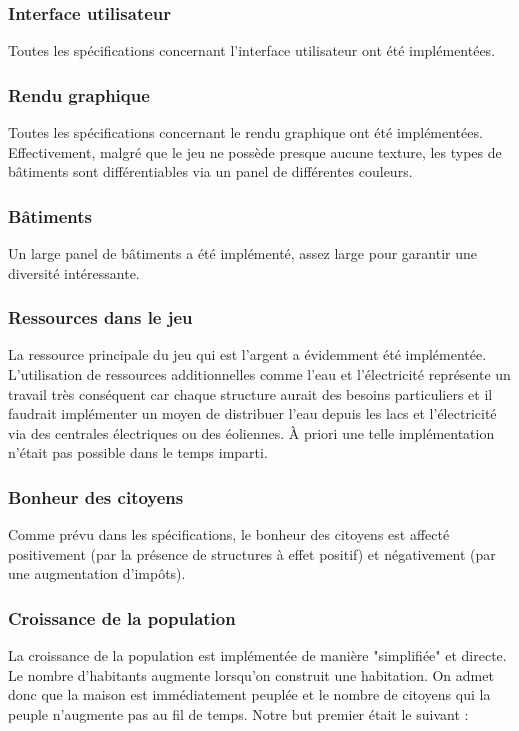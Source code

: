 \documentclass[a4paper,10pt,openany,oneside]{report}
\begin{document}
\subsubsection{Interface utilisateur}
Toutes les spécifications concernant l'interface utilisateur ont été implémentées.

\subsubsection{Rendu graphique}
Toutes les spécifications concernant le rendu graphique ont été implémentées. Effectivement, malgré que le jeu ne possède presque aucune texture, les types de bâtiments sont différentiables via un panel de différentes couleurs.

\subsubsection{Bâtiments}
Un large panel de bâtiments a été implémenté, assez large pour garantir une diversité intéressante.

\subsubsection{Ressources dans le jeu}
La ressource principale du jeu qui est l'argent a évidemment été implémentée. L'utilisation de ressources additionnelles comme l'eau et l'électricité représente un travail très conséquent car chaque structure aurait des besoins particuliers et il faudrait implémenter un moyen de distribuer l'eau depuis les lacs et l'électricité via des centrales électriques ou des éoliennes. À priori une telle implémentation n'était pas possible dans le temps imparti. 

\subsubsection{Bonheur des citoyens}
Comme prévu dans les spécifications, le bonheur des citoyens est affecté positivement (par la présence de structures à effet positif) et négativement (par une augmentation d'impôts). 

\subsubsection{Croissance de la population}
La croissance de la population est implémentée de manière "simplifiée" et directe. Le nombre d'habitants augmente lorsqu'on construit une habitation. On admet donc que la maison est immédiatement peuplée et le nombre de citoyens qui la peuple n'augmente pas au fil de temps.
Notre but premier était le suivant :
\end{document}

